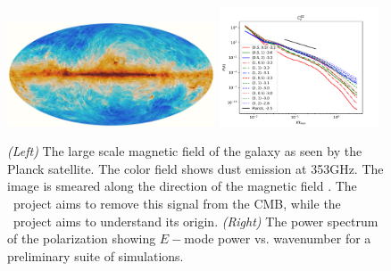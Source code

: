 
\begin{figure} \begin{center}
\includegraphics[width=0.55\textwidth]{figs/2015_353GHz_B-field.png}
\includegraphics[width=0.42\textwidth]{figs/alpha_TEB.pdf}
\caption[ ]{\emph{(Left)} The large scale magnetic field of the galaxy as seen by the Planck
satellite. The color field shows dust emission at 353GHz.  The image is smeared
along the direction of the magnetic field \citep{PlanckXIX15}.  The \nameCMB\
project aims to remove this signal from the CMB, while the \nameGalaxies\
project aims to understand its origin. \emph{(Right)} The power spectrum of the
polarization showing $E-$mode power vs. wavenumber for a preliminary suite of
simulations.}
\label{fig.planck} \end{center} \end{figure}
